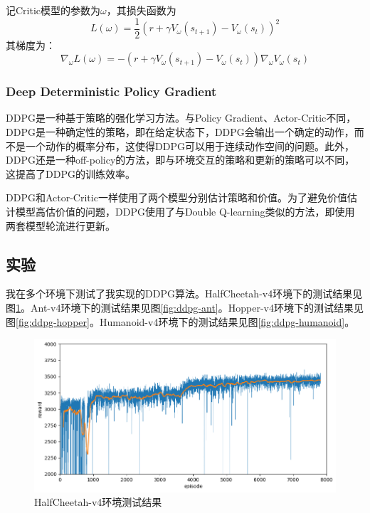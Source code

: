 \documentclass{article}
\begin{document}
记Critic模型的参数为$\omega$，其损失函数为
\begin{equation}
	L(\omega) = \frac{1}{2} (r + \gamma V_\omega(s_{t+1}) - V_\omega(s_t))^2
\end{equation}
其梯度为：
\begin{equation}
	\nabla_\omega L(\omega) = -(r + \gamma V_\omega(s_{t+1}) - V_\omega(s_t))\nabla_\omega V_\omega(s_t)
\end{equation}

\subsubsection{Deep Deterministic Policy Gradient}

DDPG是一种基于策略的强化学习方法。与Policy Gradient、Actor-Critic不同，DDPG是一种确定性的策略，即在给定状态下，DDPG会输出一个确定的动作，而不是一个动作的概率分布，这使得DDPG可以用于连续动作空间的问题。此外，DDPG还是一种off-policy的方法，即与环境交互的策略和更新的策略可以不同，这提高了DDPG的训练效率。

DDPG和Actor-Critic一样使用了两个模型分别估计策略和价值。为了避免价值估计模型高估价值的问题，DDPG使用了与Double Q-learning类似的方法，即使用两套模型轮流进行更新。

\subsection{实验}

我在多个环境下测试了我实现的DDPG算法。HalfCheetah-v4环境下的测试结果见图\ref{fig:ddpg-halfcheetah}。Ant-v4环境下的测试结果见图\ref{fig:ddpg-ant}。Hopper-v4环境下的测试结果见图\ref{fig:ddpg-hopper}。Humanoid-v4环境下的测试结果见图\ref{fig:ddpg-humanoid}。

\begin{figure}
	\centering
	\includegraphics[width=0.9\linewidth]{fig-halfcheetah.png}
	\caption{HalfCheetah-v4环境测试结果}
	\label{fig:ddpg-halfcheetah}
\end{figure}
\end{document}
